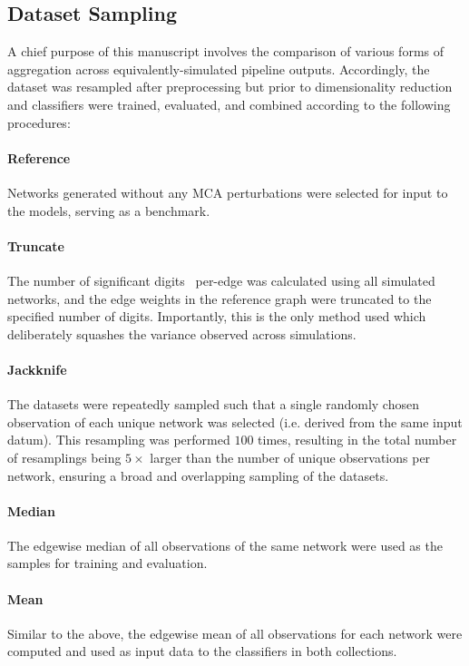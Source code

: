 \documentclass[10pt]{SelfArx} %
\begin{document}
\subsection*{Dataset Sampling}

A chief purpose of this manuscript involves the comparison of various forms of aggregation across
equivalently-simulated pipeline outputs. Accordingly, the dataset was resampled after preprocessing but prior to
dimensionality reduction and classifiers were trained, evaluated, and combined according to the following procedures:

\paragraph{Reference} Networks generated without any MCA perturbations were selected for input to the models, serving
as a benchmark.

\paragraph{Truncate} The number of significant digits~\cite{Parker1997-qq} per-edge was calculated using all
simulated networks, and the edge weights in the reference graph were truncated to the specified number of digits.
Importantly, this is the only method used which deliberately squashes the variance observed across simulations.

\paragraph{Jackknife} The datasets were repeatedly sampled such that a single randomly chosen observation of each
unique network was selected (i.e. derived from the same input datum). This resampling was performed $100$ times,
resulting in the total number of resamplings being $5\times$ larger than the number of unique observations per network,
ensuring a broad and overlapping sampling of the datasets.

\paragraph{Median} The edgewise median of all observations of the same network were used as the samples for training
and evaluation.

\paragraph{Mean} Similar to the above, the edgewise mean of all observations for each network were computed and used
as input data to the classifiers in both collections.
\end{document}
